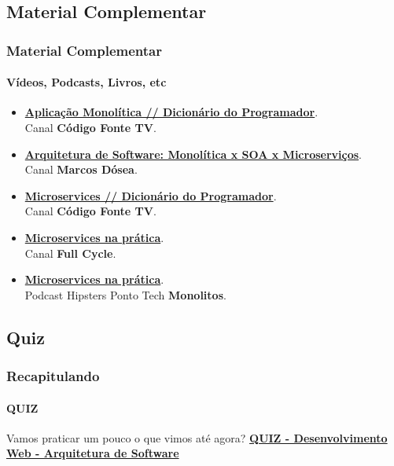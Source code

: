 \documentclass[
	10pt, %
	t, %
]{beamer}
\begin{document}


\subsection{Material Complementar}

\begin{frame}
	\frametitle{Material Complementar}
	\framesubtitle{Vídeos, Podcasts, Livros, etc}
	
	\begin{itemize}
		\item \href{https://youtu.be/CsrHHHPHKwE}{\textbf{Aplicação Monolítica // Dicionário do Programador}}.\\Canal \textbf{Código Fonte TV}.
		\item \href{https://youtu.be/suZfVAk7hco}{\textbf{Arquitetura de Software: Monolítica x SOA x Microserviços}}.\\Canal \textbf{Marcos Dósea}.
		\item \href{https://www.youtube.com/watch?v=_2bDOCTnbKc}{\textbf{Microservices // Dicionário do Programador}}.\\Canal \textbf{Código Fonte TV}.
		\item \href{https://youtu.be/gtv9szE_P1U}{\textbf{Microservices na prática}}.\\Canal \textbf{Full Cycle}.
		\item \href{https://www.hipsters.tech/uma-linguagem-para-cada-combate-hipsters-ponto-tech-277}{\textbf{Microservices na prática}}.\\Podcast Hipsters Ponto Tech \textbf{Monolitos}.
	\end{itemize}
	
\end{frame}

\subsection{Quiz}

\begin{frame}
	\frametitle{Recapitulando}
	\framesubtitle{QUIZ}

	\vfill
	\begin{block}{Vamos praticar um pouco o que vimos até agora?}
		\href{https://quizizz.com/admin/quiz/65832b860b273f1989868234?source=quiz_share}{\textbf{QUIZ - Desenvolvimento Web - Arquitetura de Software}}
	\end{block}
	\vfill
		
\end{frame}
\end{document}
